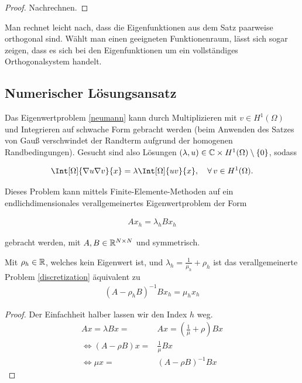 \documentclass{article}
\begin{document}
\begin{proof}
	Nachrechnen.
\end{proof}

\begin{remark}
	Man rechnet leicht nach, dass die Eigenfunktionen aus dem Satz paarweise orthogonal sind. Wählt man einen geeigneten Funktionenraum, lässt sich sogar zeigen, dass es sich bei den Eigenfunktionen um ein vollständiges Orthogonalsystem handelt.
\end{remark}

\subsection{Numerischer Lösungsansatz}

Das Eigenwertproblem \ref{neumann} kann durch Multiplizieren mit $v \in H^1(\Omega)$ und Integrieren auf schwache Form gebracht werden (beim Anwenden des Satzes von Gauß verschwindet der Randterm aufgrund der homogenen Randbedingungen). Gesucht sind also Lösungen $(\lambda, u) \in \mathbb{C} \times H^1(\Omega) \setminus \{0\}$, sodass

\begin{align*}
	\Int[\Omega]{\nabla u \nabla v}{x} = \lambda \Int[\Omega]{uv}{x}, \quad \Forall v \in H^1(\Omega).
\end{align*}

Dieses Problem kann mittels Finite-Elemente-Methoden auf ein endlichdimensionales verallgemeinertes Eigenwertproblem der Form

\begin{align} \label{discretization}
	A x_h = \lambda_h B x_h
\end{align}

gebracht werden, mit $A, B \in \mathbb{R}^{N \times N}$ und symmetrisch.

\begin{lemma}
	Mit $\rho_h \in \mathbb{R}$, welches kein Eigenwert ist, und $\lambda_h = \frac{1}{\mu_h} + \rho_h$ ist das verallgemeinerte Problem \ref{discretization} äquivalent  zu
	\begin{align} \label{equivdiscret}
		(A - \rho_h B)^{-1} B x_h = \mu_h x_h
	\end{align}
\end{lemma}

\begin{proof}
	Der Einfachheit halber lassen wir den Index $h$ weg.
	\begin{align*}
		A x = \lambda B x =& A x = (\frac{1}{\mu} + \rho) B x \\
		\Leftrightarrow (A - \rho B)x =& \frac{1}{\mu} B x \\
		\Leftrightarrow \mu x =& (A - \rho B)^{-1}B x
	\end{align*}
\end{proof}
\end{document}
